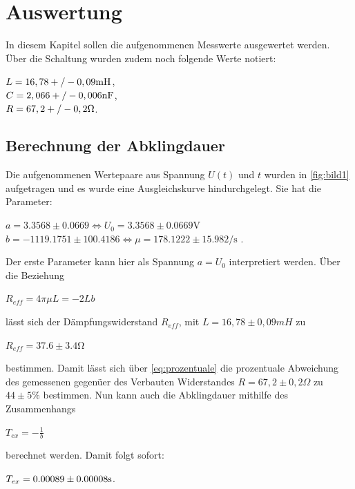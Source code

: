 \section{Auswertung}
In diesem Kapitel sollen die aufgenommenen Messwerte ausgewertet werden.
Über die Schaltung wurden zudem noch folgende Werte notiert:
\begin{center}
    $L = 16,78 +/- 0,09 \si[]{mH}$,\\
    $C = 2,066 +/- 0,006 \si[]{nF}$,\\
    $R = 67,2 +/- 0,2 \si[]{\Omega}$.\\
\end{center}
\subsection{Berechnung der Abklingdauer}
\label{sec:abklingdauer}
Die aufgenommenen Wertepaare aus Spannung $U(t)$ und $t$ wurden in \autoref{fig:bild1}
aufgetragen und es wurde eine Ausgleichskurve hindurchgelegt. Sie hat die Parameter:
\begin{center}
    
        $a = 3.3568 \pm 0.0669 \Leftrightarrow U_0 = 3.3568 \pm 0.0669 \si{\volt}$ \\
        $b = -1119.1751 \pm 100.4186 \Leftrightarrow \mu = 178.1222 \pm 15.982 \si{\per\second}$ .\\
    
\end{center}  
Der erste Parameter kann hier als Spannung $a=U_0$ interpretiert werden.
Über die Beziehung 
\begin{center}
    $R_{eff} = 4\pi\mu L = -2 L b$
\end{center}


lässt sich der Dämpfungswiderstand $R_{eff}$, mit $L = 16,78 \pm 0,09 \si{mH}$ zu
\begin{center}
    $R_{eff} = 37.6 \pm 3.4 \si{\ohm}$
\end{center}
bestimmen. Damit lässt sich über \autoref{eq:prozentuale} die prozentuale Abweichung des gemessenen
gegenüer des Verbauten Widerstandes $R = 67,2 \pm 0,2  \si{\Omega}$ zu $44\pm 5 \si{\percent}$ bestimmen.
Nun kann auch die Abklingdauer mithilfe des Zusammenhangs
\begin{center}
    $T_{ex} = - \frac{1}{b}$
\end{center}
berechnet werden. Damit folgt sofort:
\begin{center}
    $T_{ex} = 0.00089\pm 0.00008 \si[]{s}$. \\
\end{center}

